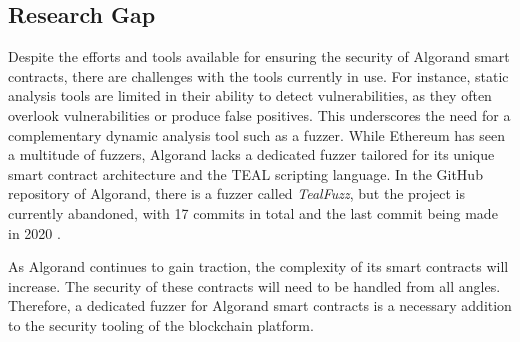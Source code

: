 \subsection*{Research Gap}
Despite the efforts and tools available for ensuring the security of Algorand smart contracts, there are challenges with the tools currently in use.
For instance, static analysis tools are limited in their ability to detect vulnerabilities, as they often overlook vulnerabilities or produce false positives.
This underscores the need for a complementary dynamic analysis tool such as a fuzzer.
While Ethereum has seen a multitude of fuzzers, Algorand lacks a dedicated fuzzer tailored for its unique smart contract architecture and the \ac{TEAL} scripting language.
In the GitHub repository of Algorand, there is a fuzzer called \textit{TealFuzz}, but the project is currently abandoned, with 17 commits in total and the last commit being made in 2020 \cite{algorand_algorandtealfuzz_nodate}.

As Algorand continues to gain traction, the complexity of its smart contracts will increase.
The security of these contracts will need to be handled from all angles.
Therefore, a dedicated fuzzer for Algorand smart contracts is a necessary addition to the security tooling of the blockchain platform.